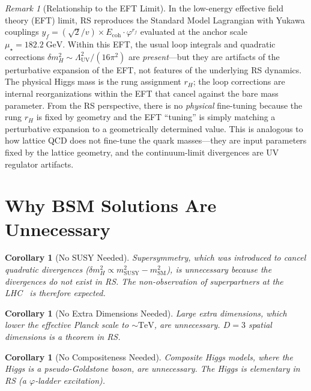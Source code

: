 \documentclass[12pt,a4paper]{article}
\newtheorem{corollary}[theorem]{Corollary}
\theoremstyle{definition}
\theoremstyle{remark}
\newtheorem{remark}[theorem]{Remark}
\begin{document}
\begin{remark}[Relationship to the EFT Limit]
\label{rem:eft}
In the low-energy effective field theory (EFT) limit, RS
reproduces the Standard Model Lagrangian with Yukawa couplings
$y_f = (\sqrt{2}/v) \times E_{\mathrm{coh}} \cdot \varphi^{r_f}$
evaluated at the anchor scale $\mu_\star = 182.2\;\mathrm{GeV}$.
Within this EFT, the usual loop integrals and quadratic corrections
$\delta m_H^2 \sim \Lambda_{\mathrm{UV}}^2/(16\pi^2)$ are
\emph{present}---but they are artifacts of the perturbative expansion
of the EFT, not features of the underlying RS dynamics.  The physical
Higgs mass is the rung assignment $r_H$; the loop corrections are
internal reorganizations within the EFT that cancel against the bare
mass parameter.  From the RS perspective, there is no
\emph{physical} fine-tuning because the rung $r_H$ is fixed by
geometry and the EFT ``tuning'' is simply matching a perturbative
expansion to a geometrically determined value.  This is analogous to
how lattice QCD does not fine-tune the quark masses---they are input
parameters fixed by the lattice geometry, and the continuum-limit
divergences are UV regulator artifacts.
\end{remark}

\section{Why BSM Solutions Are Unnecessary}
\label{sec:no-bsm}

\begin{corollary}[No SUSY Needed]
Supersymmetry, which was introduced to cancel quadratic
divergences ($\delta m_H^2 \propto m_{\mathrm{SUSY}}^2 -
m_{\mathrm{SM}}^2$), is unnecessary because the divergences
do not exist in RS.  The non-observation of superpartners at
the LHC~\cite{ATLAS2020, CMS2020} is therefore expected.
\end{corollary}

\begin{corollary}[No Extra Dimensions Needed]
Large extra dimensions, which lower the effective Planck scale
to $\sim\mathrm{TeV}$, are unnecessary.  $D = 3$ spatial
dimensions is a theorem in RS.
\end{corollary}

\begin{corollary}[No Compositeness Needed]
Composite Higgs models, where the Higgs is a pseudo-Goldstone
boson, are unnecessary.  The Higgs is elementary in RS
(a $\varphi$-ladder excitation).
\end{corollary}
\end{document}
